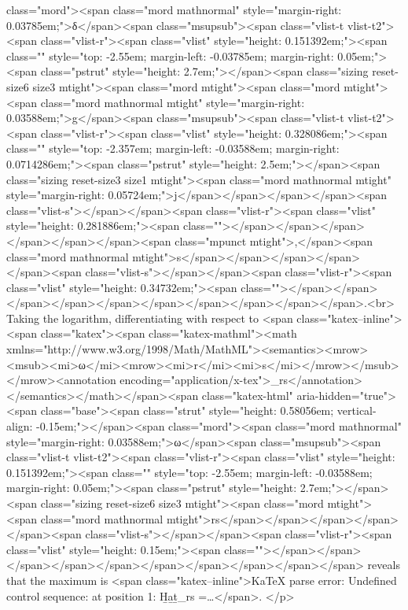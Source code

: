class="mord"><span class="mord mathnormal" style="margin-right: 0.03785em;">δ</span><span class="msupsub"><span class="vlist-t vlist-t2"><span class="vlist-r"><span class="vlist" style="height: 0.151392em;"><span class="" style="top: -2.55em; margin-left: -0.03785em; margin-right: 0.05em;"><span class="pstrut" style="height: 2.7em;"></span><span class="sizing reset-size6 size3 mtight"><span class="mord mtight"><span class="mord mtight"><span class="mord mathnormal mtight" style="margin-right: 0.03588em;">g</span><span class="msupsub"><span class="vlist-t vlist-t2"><span class="vlist-r"><span class="vlist" style="height: 0.328086em;"><span class="" style="top: -2.357em; margin-left: -0.03588em; margin-right: 0.0714286em;"><span class="pstrut" style="height: 2.5em;"></span><span class="sizing reset-size3 size1 mtight"><span class="mord mathnormal mtight" style="margin-right: 0.05724em;">j</span></span></span></span><span class="vlist-s">​</span></span><span class="vlist-r"><span class="vlist" style="height: 0.281886em;"><span class=""></span></span></span></span></span></span><span class="mpunct mtight">,</span><span class="mord mathnormal mtight">s</span></span></span></span></span><span class="vlist-s">​</span></span><span class="vlist-r"><span class="vlist" style="height: 0.34732em;"><span class=""></span></span></span></span></span></span></span></span></span></span>.<br>
Taking the logarithm, differentiating with respect to <span class="katex--inline"><span class="katex"><span class="katex-mathml"><math xmlns="http://www.w3.org/1998/Math/MathML"><semantics><mrow><msub><mi>ω</mi><mrow><mi>r</mi><mi>s</mi></mrow></msub></mrow><annotation encoding="application/x-tex">\omega_{rs}</annotation></semantics></math></span><span class="katex-html" aria-hidden="true"><span class="base"><span class="strut" style="height: 0.58056em; vertical-align: -0.15em;"></span><span class="mord"><span class="mord mathnormal" style="margin-right: 0.03588em;">ω</span><span class="msupsub"><span class="vlist-t vlist-t2"><span class="vlist-r"><span class="vlist" style="height: 0.151392em;"><span class="" style="top: -2.55em; margin-left: -0.03588em; margin-right: 0.05em;"><span class="pstrut" style="height: 2.7em;"></span><span class="sizing reset-size6 size3 mtight"><span class="mord mtight"><span class="mord mathnormal mtight">rs</span></span></span></span></span><span class="vlist-s">​</span></span><span class="vlist-r"><span class="vlist" style="height: 0.15em;"><span class=""></span></span></span></span></span></span></span></span></span></span> reveals that the maximum is <span class="katex--inline">KaTeX parse error: Undefined control sequence: \Hat at position 1: \̲H̲a̲t̲{\omega_{rs}} =…</span>. \cite{karrer_newman_2011}</p>

